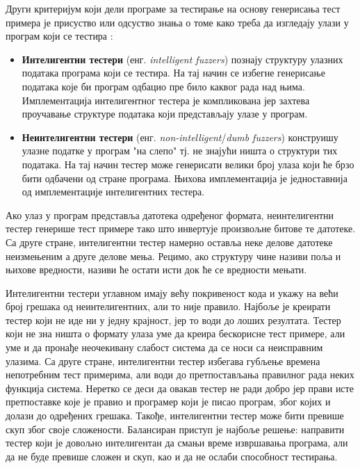 \documentclass[12pt,oneside]{memoir}
\begin{document}
Други критеријум који дели програме за тестирање на основу генерисања тест примера је присуство или одсуство знања о томе како треба да изгледају улази у програм који се тестира \cite{fuzzingBrute, fuzzing}:
\begin{itemize}
\item \textbf{Интелигентни тестери} (енг. \textit{intelligent fuzzers}) познају структуру улазних података програма који се тестира. На тај начин се избегне генерисање података које би програм одбацио пре било каквог рада над њима. Имплементација интелигентног тестера је компликована јер захтева проучавање структуре података који представљају улазе у програм.
\item \textbf{Неинтелигентни тестери} (енг. \textit{non-intelligent}/\textit{dumb fuzzers}) конструишу улазне податке у програм "на слепо" тј. не знајући ништа о структури тих података. На тај начин тестер може генерисати велики број улаза који ће брзо бити одбачени од стране програма.
Њихова имплементација је једноставнија од имплементације интелигентних тестера.
\end{itemize}

Ако улаз у програм представља датотека одређеног формата, неинтелигентни тестер генерише тест примере тако што инвертује произвољне битове те датотеке. Са друге стране, интелигентни тестер намерно оставља неке делове датотеке неизмењеним а друге делове мења. Рецимо, ако структуру чине називи поља и њихове вредности, називи ће остати исти док ће се вредности мењати.

Интелигентни тестери углавном имају већу покривеност кода и укажу на већи број грешака од неинтелигентних, али то није правило. Најбоље је креирати тестер који не иде ни у једну крајност, јер то води до лоших резултата. Тестер који не зна ништа о формату улаза уме да креира бескорисне тест примере, али уме и да пронађе неочекивану слабост система да се носи са неисправним улазима. Са друге стране, интелигентни тестер избегава губљење времена непотребним тест примерима, али води до претпостављања правилног рада неких функција система. Неретко се деси да овакав тестер не ради добро јер прави исте претпоставке које је правио и програмер који је писао програм, због којих и долази до одређених грешака. Такође, интелигентни тестер може бити превише скуп због своје сложености. Балансиран приступ је најбоље решење: направити тестер који је довољно интелигентан да смањи време извршавања програма, али да не буде превише сложен и скуп, као и да не ослаби способност тестирања.
\end{document}
